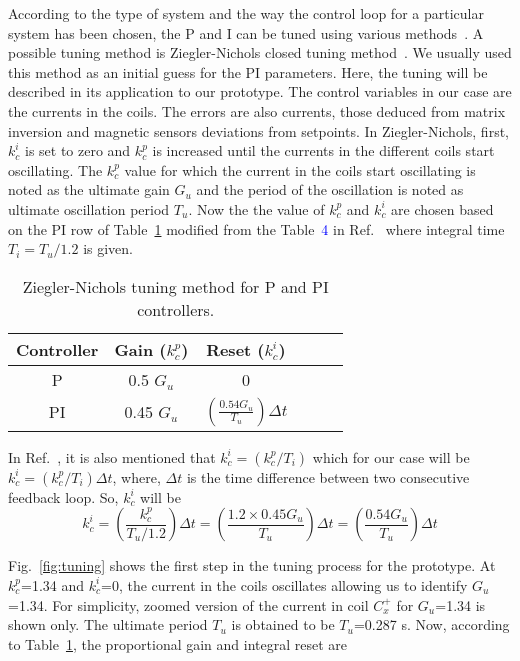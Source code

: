 According to the type of system and the way the control loop for a particular system has been chosen, the P and I can be tuned using various methods~\cite{tuning}. A possible tuning method is Ziegler-Nichols closed tuning method~\cite{tuning_ZN}. We usually used this method as an initial guess for the PI parameters. Here, the tuning will be described in its application to our prototype. The control variables in our case are the currents in the coils. The errors are also currents, those deduced from matrix inversion and magnetic sensors deviations from setpoints. In Ziegler-Nichols, first, $k_c^i$ is set to zero and $k_c^p$ is increased until the currents in the different coils start oscillating. The $k_c^p$ value for which the current in the coils start oscillating is noted as the ultimate gain $G_{u}$ and the period of the oscillation is noted as ultimate oscillation period $T_u$. Now the the value of $k_c^p$ and $k_c^i$ are chosen based on the PI row of Table~\ref{table:tuning} modified from the Table~\textcolor{blue}{4} in Ref.~\cite{tuning_formula} where integral time $T_i=T_u/1.2$ is given. 

\begin{table} [htb!]
    \centering
    \begin{tabular} { |c|c|c|c|c|c|} 
        \hline
        Controller & Gain ($k_c^p$) & Reset ($k_c^i$)\\
        \hline\hline
         P & 0.5 $G_u$ & 0 \\ 
        \hline
         PI & 0.45 $G_u$ & $\left(\frac{\text{0.54} G_u}{T_u}\right)\Delta t$ \\ 
        \hline
    \end{tabular}
    \caption{Ziegler-Nichols tuning method for P and PI controllers.}\label{table:tuning}
\end{table}

\FloatBarrier
In Ref.~\cite{tuning_formula}, it is also mentioned that $k_c^i=(k_c^p/T_i)$ which for our case will be $k_c^i=(k_c^p/T_i)\Delta t$, where, $\Delta t$ is the time difference between two consecutive feedback loop. So, $k_c^i$ will be
\begin{equation}
    k_c^i=\left(\frac{k_c^p}{T_u/1.2}\right)\Delta t=\left(\frac{1.2\times0.45 G_u}{T_u}\right)\Delta t=\left(\frac{0.54 G_u}{T_u}\right)\Delta t
\end{equation}

\FloatBarrier
Fig.~\ref{fig:tuning} shows the first step in the tuning process for the prototype. At $k_c^p$=1.34 and $k_c^i$=0, the current in the coils oscillates allowing us to identify $G_u$=1.34. For simplicity, zoomed version of the current in coil $C_x^+$ for $G_u$=1.34 is shown only. The ultimate period $T_u$ is obtained to be $T_u$=0.287 s. Now, according to Table~\ref{table:tuning}, the proportional gain and integral reset are

